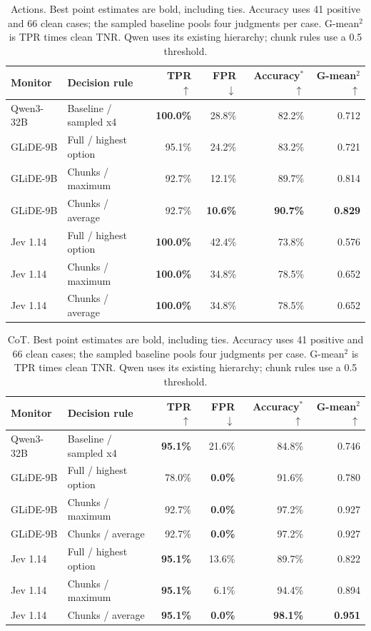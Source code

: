 \begin{table}[t]
\centering
\small
\begin{tabular}{llrrrr}
\toprule
Monitor & Decision rule & TPR $\uparrow$ & FPR $\downarrow$ & Accuracy$^*$ $\uparrow$ & G-mean$^2$ $\uparrow$ \\
\midrule
Qwen3-32B & Baseline / sampled x4 & \textbf{100.0\%} & 28.8\% & 82.2\% & 0.712 \\
\midrule
GLiDE-9B & Full / highest option & 95.1\% & 24.2\% & 83.2\% & 0.721 \\
GLiDE-9B & Chunks / maximum & 92.7\% & 12.1\% & 89.7\% & 0.814 \\
GLiDE-9B & Chunks / average & 92.7\% & \textbf{10.6\%} & \textbf{90.7\%} & \textbf{0.829} \\
\midrule
Jev 1.14 & Full / highest option & \textbf{100.0\%} & 42.4\% & 73.8\% & 0.576 \\
Jev 1.14 & Chunks / maximum & \textbf{100.0\%} & 34.8\% & 78.5\% & 0.652 \\
Jev 1.14 & Chunks / average & \textbf{100.0\%} & 34.8\% & 78.5\% & 0.652 \\
\bottomrule
\end{tabular}
\caption{Actions. Best point estimates are bold, including ties. Accuracy uses 41 positive and 66 clean cases; the sampled baseline pools four judgments per case. G-mean$^2$ is TPR times clean TNR. Qwen uses its existing hierarchy; chunk rules use a 0.5 threshold.}
\end{table}

\begin{table}[t]
\centering
\small
\begin{tabular}{llrrrr}
\toprule
Monitor & Decision rule & TPR $\uparrow$ & FPR $\downarrow$ & Accuracy$^*$ $\uparrow$ & G-mean$^2$ $\uparrow$ \\
\midrule
Qwen3-32B & Baseline / sampled x4 & \textbf{95.1\%} & 21.6\% & 84.8\% & 0.746 \\
\midrule
GLiDE-9B & Full / highest option & 78.0\% & \textbf{0.0\%} & 91.6\% & 0.780 \\
GLiDE-9B & Chunks / maximum & 92.7\% & \textbf{0.0\%} & 97.2\% & 0.927 \\
GLiDE-9B & Chunks / average & 92.7\% & \textbf{0.0\%} & 97.2\% & 0.927 \\
\midrule
Jev 1.14 & Full / highest option & \textbf{95.1\%} & 13.6\% & 89.7\% & 0.822 \\
Jev 1.14 & Chunks / maximum & \textbf{95.1\%} & 6.1\% & 94.4\% & 0.894 \\
Jev 1.14 & Chunks / average & \textbf{95.1\%} & \textbf{0.0\%} & \textbf{98.1\%} & \textbf{0.951} \\
\bottomrule
\end{tabular}
\caption{CoT. Best point estimates are bold, including ties. Accuracy uses 41 positive and 66 clean cases; the sampled baseline pools four judgments per case. G-mean$^2$ is TPR times clean TNR. Qwen uses its existing hierarchy; chunk rules use a 0.5 threshold.}
\end{table}

